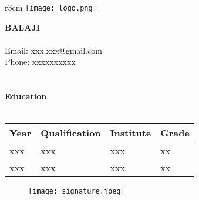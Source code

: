 \documentclass{article}
\begin{document}
\pagestyle{empty}
\begin{wrapfigure}{r}{3cm}
    \texttt{[image: logo.png]}
\end{wrapfigure}
\textbf{\huge{BALAJI}}\\\\
Email: xxx.xxx@gmail.com\\
Phone: xxxxxxxxxx\\\\\\
\textbf{\Large{Education}}\\\\
\begin{tabular}{|p{0.5in}|p{1.5in}|p{2in}|p{0.5in}|}
    \hline
    Year & Qualification & Institute & Grade\\
    \hline
    xxx & xxx & xxx & xx\\
    \hline
    xxx & xxx & xxx & xx\\
    \hline
\end{tabular}
\vfill
\begin{figure}[h!]
    \flushright
    \texttt{[image: signature.jpeg]}
\end{figure}
\end{document}
